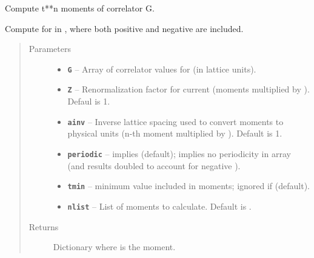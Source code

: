 \documentclass[letterpaper,10pt,english]{sphinxmanual}
\begin{document}
\begin{fulllineitems}
\label{g2tools:g2tools.moments}
Compute t**n moments of correlator G.

Compute  for  in , where both positive and
negative  are included.
\begin{quote}\begin{description}
\item[{Parameters}] \leavevmode\begin{itemize}
\item {} 
\textbf{\texttt{G}} -- Array of correlator values  for  (in
lattice units).

\item {} 
\textbf{\texttt{Z}} -- Renormalization factor for current (moments multiplied by ).
Defaul is 1.

\item {} 
\textbf{\texttt{ainv}} -- Inverse lattice spacing used to convert moments to
physical units (n-th moment multiplied by ).
Default is 1.

\item {} 
\textbf{\texttt{periodic}} --  implies  (default);
 implies no periodicity in array 
(and results doubled to account for negative ).

\item {} 
\textbf{\texttt{tmin}} -- minimum  value included in moments; ignored
if  (default).

\item {} 
\textbf{\texttt{nlist}} -- List of moments to calculate. Default is
.

\end{itemize}

\item[{Returns}] \leavevmode
Dictionary  where  is the  moment.

\end{description}\end{quote}

\end{fulllineitems}

\end{document}
